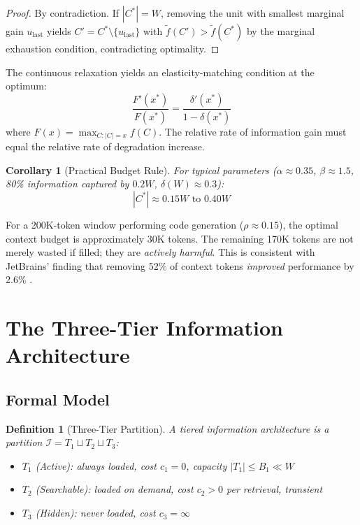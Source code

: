 \documentclass[11pt, a4paper, logo, copyright]{googledeepmind}
\newtheorem{definition}{Definition}[section]
\newtheorem{corollary}{Corollary}[section]
\begin{document}
\begin{proof}
By contradiction. If $|C^*| = W$, removing the unit with smallest marginal gain $u_{\text{last}}$ yields $C' = C^* \setminus \{u_{\text{last}}\}$ with $\tilde{f}(C') > \tilde{f}(C^*)$ by the marginal exhaustion condition, contradicting optimality.
\end{proof}

The continuous relaxation yields an elasticity-matching condition at the optimum:
$$\frac{F'(x^*)}{F(x^*)} = \frac{\delta'(x^*)}{1 - \delta(x^*)}$$
where $F(x) = \max_{C:|C|=x} f(C)$. The relative rate of information gain must equal the relative rate of degradation increase.

\begin{corollary}[Practical Budget Rule]
\label{cor:budget}
For typical parameters ($\alpha \approx 0.35$, $\beta \approx 1.5$, 80\% information captured by $0.2W$, $\delta(W) \approx 0.3$):
$$|C^*| \approx 0.15W \text{ to } 0.40W$$
\end{corollary}

For a 200K-token window performing code generation ($\rho \approx 0.15$), the optimal context budget is approximately 30K tokens. The remaining 170K tokens are not merely wasted if filled; they are \emph{actively harmful}. This is consistent with JetBrains' finding that removing 52\% of context tokens \emph{improved} performance by 2.6\% \citep{jetbrains2025complexity}.


\section{The Three-Tier Information Architecture}
\label{sec:tiered}

\subsection{Formal Model}

\begin{definition}[Three-Tier Partition]
\label{def:tiers}
A tiered information architecture is a partition $\mathcal{I} = T_1 \sqcup T_2 \sqcup T_3$:
\begin{itemize}[nosep]
    \item $T_1$ (Active): always loaded, cost $c_1 = 0$, capacity $|T_1| \leq B_1 \ll W$
    \item $T_2$ (Searchable): loaded on demand, cost $c_2 > 0$ per retrieval, transient
    \item $T_3$ (Hidden): never loaded, cost $c_3 = \infty$
\end{itemize}
\end{definition}
\end{document}
